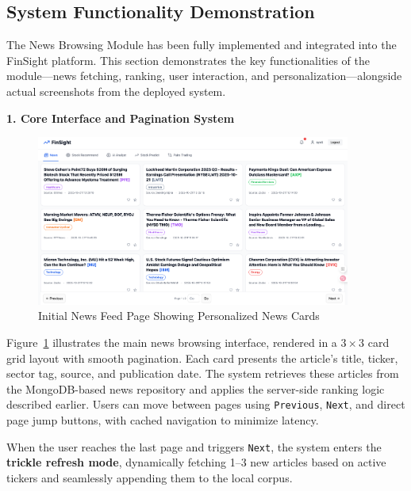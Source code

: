 \subsection{System Functionality Demonstration}

The News Browsing Module has been fully implemented and integrated into the FinSight platform. This section demonstrates the key functionalities of the module—news fetching, ranking, user interaction, and personalization—alongside actual screenshots from the deployed system.

\textbf{1. Core Interface and Pagination System}

\begin{figure}[H]
  \centering
  \includegraphics[width=0.92\textwidth]{images/news/page1.png}
  \caption{Initial News Feed Page Showing Personalized News Cards}
  \label{fig:news_page1}
\end{figure}

Figure~\ref{fig:news_page1} illustrates the main news browsing interface, rendered in a \(3\times3\) card grid layout with smooth pagination. Each card presents the article’s title, ticker, sector tag, source, and publication date. The system retrieves these articles from the MongoDB-based news repository and applies the server-side ranking logic described earlier. Users can move between pages using \texttt{Previous}, \texttt{Next}, and direct page jump buttons, with cached navigation to minimize latency.

When the user reaches the last page and triggers \texttt{Next}, the system enters the \textbf{trickle refresh mode}, dynamically fetching 1–3 new articles based on active tickers and seamlessly appending them to the local corpus.

